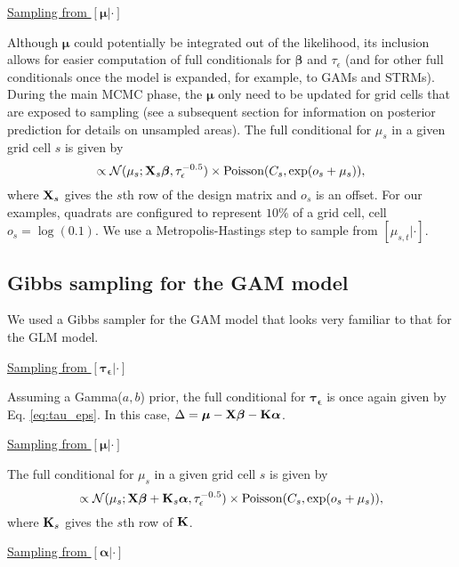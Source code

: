 \documentclass[12pt,fleqn]{article}
\begin{document}
\begin{flushleft}
\underline{Sampling from $[\boldsymbol{\mu}|\cdot]$}

Although $\boldsymbol{\mu}$ could potentially be integrated out of the likelihood, its inclusion allows for easier computation of full conditionals for $\boldsymbol{\beta}$ and $\tau_\epsilon$ (and for other full conditionals once the model is expanded, for example, to GAMs and STRMs).  During the main MCMC phase, the $\boldsymbol{\mu}$ only need to be updated for grid cells that are exposed to sampling (see a subsequent section for information on posterior prediction for details on unsampled areas).  The full conditional for $\mu_s$ in a given grid cell $s$ is given by
\begin{equation*}
  [\mu_{s,t} | \cdot] \propto \mathcal{N}(\mu_s;{\bf X}_s \boldsymbol{\beta},\tau_\epsilon^{-0.5}) \times \textrm{Poisson}(C_s,\exp(o_s+\mu_s)),
\end{equation*}
where ${\bf X}_s$ gives the $s$th row of the design matrix and $o_s$ is an offset.  For our examples, quadrats are configured to represent $10\%$ of a grid cell, cell $o_s = \log(0.1)$.
We use a Metropolis-Hastings step to sample from $[\mu_{s,t} | \cdot]$.

\subsection{Gibbs sampling for the GAM model}

We used a Gibbs sampler for the GAM model that looks very familiar to that for the GLM model.

\underline{Sampling from $[\boldsymbol{\tau_\epsilon}|\cdot]$}

Assuming a Gamma($a,b$) prior, the full conditional for $\boldsymbol{\tau_\epsilon}$ is once again given by Eq. \ref{eq:tau_eps}.  In this case,
$\Delta = \boldsymbol{\mu}-{\bf X}\boldsymbol{\beta}-{\bf K}\boldsymbol{\alpha}$.

\underline{Sampling from $[\boldsymbol{\mu}|\cdot]$}

The full conditional for $\mu_s$ in a given grid cell $s$ is given by
\begin{equation*}
  [\mu_{s,t} | \cdot] \propto \mathcal{N}(\mu_s;{\bf X}\boldsymbol{\beta}+{\bf K}_s \boldsymbol{\alpha},\tau_\epsilon^{-0.5}) \times \textrm{Poisson}(C_s,\exp(o_s+\mu_s)),
\end{equation*}
where ${\bf K}_s$ gives the $s$th row of ${\bf K}$.

\underline{Sampling from $[\boldsymbol{\alpha}|\cdot]$}


\end{flushleft}
\end{document}
